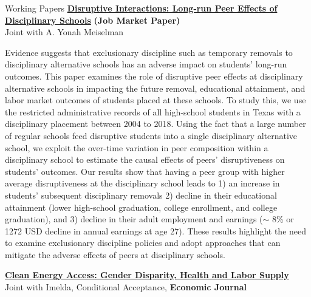 \documentclass{resume} %
\begin{document}
\begin{rSection}{Working Papers}
\vspace{.5em}
\href{https://anjalipverma.github.io/files/JMP\%20-\%20Anjali\%20P\%20Verma\%20-\%20UT\%20Austin.pdf}{\bf {\color{dark}Disruptive Interactions: Long-run Peer Effects of Disciplinary Schools}} {\bf (Job Market Paper)}\\Joint with A. Yonah Meiselman

Evidence suggests that exclusionary discipline such as temporary removals to disciplinary alternative schools has an adverse impact on students' long-run outcomes. This paper examines the role of disruptive peer effects at disciplinary alternative schools in impacting the future removal, educational attainment, and labor market outcomes of students placed at these schools. To study this, we use the restricted administrative records of all high-school students in Texas with a disciplinary placement between 2004 to 2018. Using the fact that a large number of regular schools feed disruptive students into a single disciplinary alternative school, we exploit the over-time variation in peer composition within a disciplinary school to estimate the causal effects of peers' disruptiveness on students’ outcomes. Our results show that having a peer group with higher average disruptiveness at the disciplinary school leads to 1) an increase in students' subsequent disciplinary removals 2) decline in their educational attainment (lower high-school graduation, college enrollment, and college graduation), and 3) decline in their adult employment and earnings ($\sim$ 8\% or 1272 USD decline in annual earnings at age 27). These results highlight the need to examine exclusionary discipline policies and adopt approaches that can mitigate the adverse effects of peers at disciplinary schools.
\vspace{.7em}


\href{https://anjalipverma.github.io/files/CleanEnergyAccess_V2.pdf}{\bf {\color{dark}Clean Energy Access: Gender Disparity, Health and Labor Supply} }\\Joint with Imelda, Conditional Acceptance, {\bf Economic Journal}


\end{rSection}
\end{document}
